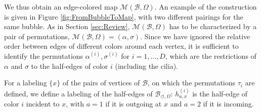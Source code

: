 \documentclass[aps,prd,10pt,notitlepage,nofootinbib,superscriptaddress,showkeys,showpacs]{revtex4-1}
\begin{document}
We thus obtain an edge-colored map ${\mathcal{M}}({\mathcal{B}}, \Omega)$. An example of the construction is given in Figure \ref{fig:FromBubbleToMap}, with two different pairings for the same bubble. As in Section \ref{sec:Review}, ${\mathcal{M}}({\mathcal{B}}, \Omega)$ has to be characterized by a pair of permutations, ${\mathcal{M}}({\mathcal{B}}, \Omega) = (\alpha, \sigma)$. Since we have ignored the relative order between edges of different colors around each vertex, it is sufficient to identify the permutations $\alpha^{(i)}, \sigma^{(i)}$ for $i=1, \dotsc, D$, which are the restrictions of $\alpha$ and $\sigma$ to the half-edges of color $i$ (including the cilia).

For a labeling $\{x\}$ of the pairs of vertices of ${\mathcal{B}}$, on which the permutations $\tau_i$ are defined, we define a labeling of the half-edges of ${\mathcal{B}}_{\circlearrowleft, \Omega}$: $h^{(i)}_{a,x}$ is the half-edge of color $i$ incident to $x$, with $a=1$ if it is outgoing at $x$ and $a=2$ if it is incoming.
\end{document}
